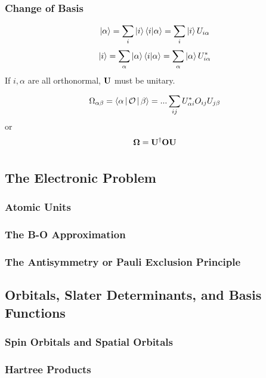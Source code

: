 \documentclass[a4paper]{article}
\numberwithin{equation}{section}
\begin{document}
\subsubsection{Change of Basis}
\begin{equation}\label{key}
\ket{\alpha} = \sum_i\ket{i}\braket{i | \alpha} = \sum_i\ket{i} U_{i\alpha}
\end{equation}
\begin{equation}\label{key}
\ket{i} = \sum_\alpha \ket{\alpha}\braket{i | \alpha} = \sum_\alpha \ket{\alpha} U_{i\alpha}^*
\end{equation}
If $ i, \alpha $ are all orthonormal, $ \vb{U} $ must be unitary.

\begin{equation}\label{key}
\Omega_{\alpha\beta} = \Braket{\alpha | \mathcal{O} | \beta} = ... \sum_{ij} U_{\alpha i}^* O_{ij} U_{j\beta}
\end{equation}
or
\begin{equation}\label{key}
\bm\Omega = \vb{U}^\dagger \vb{O} \vb{U}
\end{equation}


\section{}
\subsection{The Electronic Problem}
\subsubsection{Atomic Units}
\subsubsection{The B-O Approximation}
\subsubsection{The Antisymmetry or Pauli Exclusion Principle}
\subsection{Orbitals, Slater Determinants, and Basis Functions}
\subsubsection{Spin Orbitals and Spatial Orbitals}
\subsubsection{Hartree Products}
\end{document}
